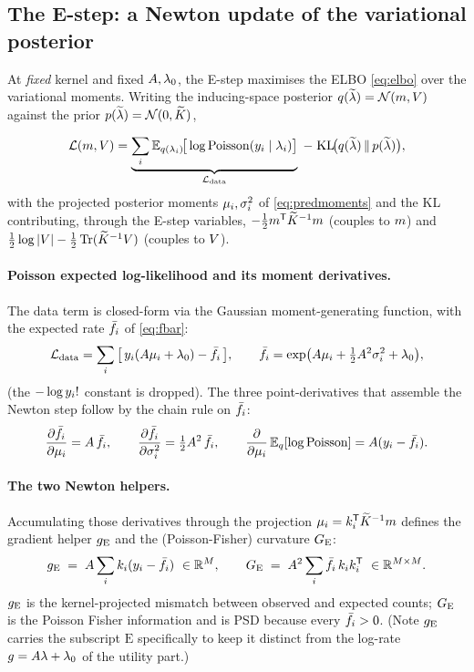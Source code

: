 \subsection{The E-step: a Newton update of the variational posterior}
\label{subsec:estep}

At \emph{fixed} kernel and fixed $A,\lambda_{0}$, the E-step maximises the ELBO
\eqref{eq:elbo} over the variational moments. Writing the inducing-space
posterior $q(\widetilde{\lambda})=\mathcal{N}(m,V)$ against the prior $p(\widetilde{\lambda})=\mathcal{N}(0,\widetilde{K})$,

\begin{equation}
\mathcal{L}(m,V)
  = \underbrace{\sum_i \mathbb{E}_{q(\lambda_i)}\!\big[\log\mathrm{Poisson}(y_i\mid\lambda_i)\big]}_{\mathcal{L}_{\mathrm{data}}}
    \;-\; \mathrm{KL}\!\big(q(\widetilde{\lambda})\,\|\,p(\widetilde{\lambda})\big),
\label{eq:estep-obj}
\end{equation}
with the projected posterior moments $\mu_i,\sigma^{2}_i$ of \eqref{eq:predmoments}
and the KL contributing, through the E-step variables,
$-\tfrac12m^{\mathsf{T}}\widetilde{K}^{-1}m$ (couples to $m$) and
$\tfrac12\log|V|-\tfrac12\operatorname{Tr}(\widetilde{K}^{-1}V)$ (couples to $V$).

\paragraph{Poisson expected log-likelihood and its moment derivatives.}
The data term is closed-form via the Gaussian moment-generating function, with
the expected rate $\bar{f}_i$ of \eqref{eq:fbar}:
\begin{equation}
\mathcal{L}_{\mathrm{data}}
  = \sum_i\big[\,y_i(A\mu_i+\lambda_{0})-\bar{f}_i\,\big],
\qquad
\bar{f}_i=\exp\!\big(A\mu_i+\tfrac12A^2\sigma^{2}_i+\lambda_{0}\big),
\end{equation}
(the $-\log y_i!$ constant is dropped). The three point-derivatives that
assemble the Newton step follow by the chain rule on $\bar{f}_i$:
\begin{equation}
\frac{\partial\bar{f}_i}{\partial\mu_i}=A\,\bar{f}_i,\qquad
\frac{\partial\bar{f}_i}{\partial\sigma^{2}_i}=\tfrac12A^2\,\bar{f}_i,\qquad
\frac{\partial}{\partial\mu_i}\,\mathbb{E}_{q}[\log\mathrm{Poisson}]=A(y_i-\bar{f}_i).
\end{equation}

\paragraph{The two Newton helpers.}
Accumulating those derivatives through the projection $\mu_i=k_i^{\mathsf{T}}\widetilde{K}^{-1}m$
defines the gradient helper $g_{\mathrm{E}}$ and the (Poisson-Fisher) curvature $G_{\mathrm{E}}$:
\begin{equation}
\gE \;=\; \gain\sum_i \kvec_i(\spk_i-\fbar_i)\ \in\Reals^{\Mind},
\qquad
\GE \;=\; \gain^2\sum_i \fbar_i\,\kvec_i\kvec_i\transpose\ \in\Reals^{\Mind\times\Mind}.
\label{eq:estep-gG}
\end{equation}
$g_{\mathrm{E}}$ is the kernel-projected mismatch between observed and expected counts;
$G_{\mathrm{E}}$ is the Poisson Fisher information and is PSD because every $\bar{f}_i>0$.
(Note $g_{\mathrm{E}}$ carries the subscript $\mathrm{E}$ specifically to keep it distinct
from the log-rate $g=A\lambda+\lambda_{0}$ of the utility part.)

